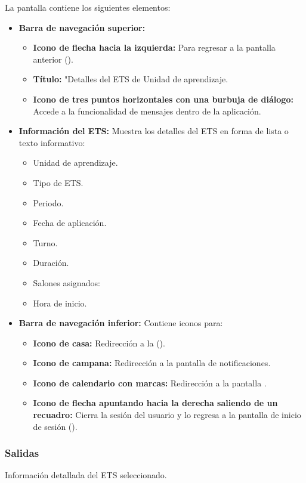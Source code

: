 La pantalla contiene los siguientes elementos:
\begin{itemize}
	\item \textbf{Barra de navegación superior:}
	\begin{itemize}
		\item \textbf{Icono de flecha hacia la izquierda:} Para regresar a la pantalla anterior ().
		\item \textbf{Título:} "Detalles del ETS de Unidad de aprendizaje.
		\item \textbf{Icono de tres puntos horizontales con una burbuja de diálogo:} Accede a la funcionalidad de mensajes dentro de la aplicación.
	\end{itemize}
	\item \textbf{Información del ETS:} Muestra los detalles del ETS en forma de lista o texto informativo:
	\begin{itemize}
		\item Unidad de aprendizaje.
		\item Tipo de ETS.
		\item Periodo.
		\item Fecha de aplicación.
		\item Turno.
		\item Duración.
		\item Salones asignados:
		\item Hora de inicio.
	\end{itemize}
	\item \textbf{Barra de navegación inferior:} Contiene iconos para:
	\begin{itemize}
		\item \textbf{Icono de casa:} Redirección a la ().
		\item \textbf{Icono de campana:} Redirección a la pantalla de notificaciones.
		\item \textbf{Icono de calendario con marcas:} Redirección a la pantalla .
		\item \textbf{Icono de flecha apuntando hacia la derecha saliendo de un recuadro:} Cierra la sesión del usuario y lo regresa a la pantalla de inicio de sesión ().
	\end{itemize}
\end{itemize}

\subsubsection{Salidas}
Información detallada del ETS seleccionado.

